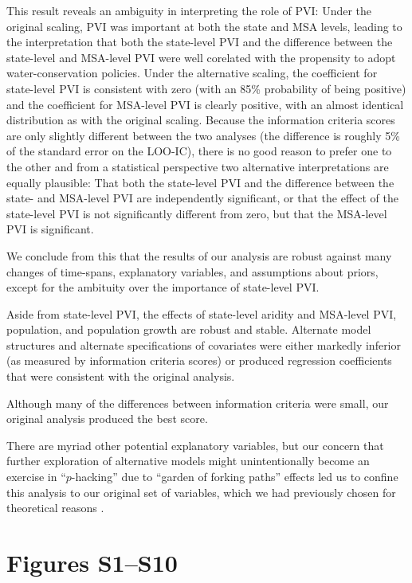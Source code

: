 \documentclass[draft]{agujournal}\usepackage{knitr}
\begin{document}
This result reveals an ambiguity in interpreting the role of PVI:
Under the original scaling, PVI was important at both the state and MSA levels,
leading to the interpretation that both the state-level PVI and the difference between
the state-level and MSA-level PVI were well corelated with the propensity to adopt
water-conservation policies. Under the alternative scaling, the
coefficient for state-level PVI is consistent with zero
(with an 85\% probability of being positive)
and the coefficient for MSA-level PVI is clearly positive, with an almost
identical distribution as with the original scaling.
Because the information criteria scores are only slightly different between
the two analyses (the difference is roughly 5\% of the standard error on the LOO-IC),
there is no good reason to prefer one to the other and from a statistical perspective
two alternative interpretations are equally plausible: That both the state-level PVI
and the difference between the state- and MSA-level PVI are independently significant,
or that the effect of the state-level PVI is not significantly different from zero,
but that the MSA-level PVI is significant.

We conclude from this that the results of our analysis are robust against
many changes of time-spans, explanatory variables, and assumptions about priors,
except for the ambituity over the importance of state-level PVI.

Aside from state-level PVI, the effects of state-level aridity and
MSA-level PVI, population, and population growth are robust and stable.
Alternate model structures and alternate specifications of covariates were either
markedly inferior (as measured by information criteria scores) or produced
regression coefficients that were consistent with the original analysis.

Although many of the differences between information criteria were small,
our original analysis produced the best score.

There are myriad other potential explanatory variables, but our concern that
further exploration of alternative models might
unintentionally become an exercise in ``$p$-hacking'' due to
``garden of forking paths'' effects \citep{gelman:forking.paths:2014}
led us to confine this analysis to our original set of variables, which
we had previously chosen for theoretical reasons \citep{hess:drought:2016}.

\section*{Figures S1--S10}
\end{document}
